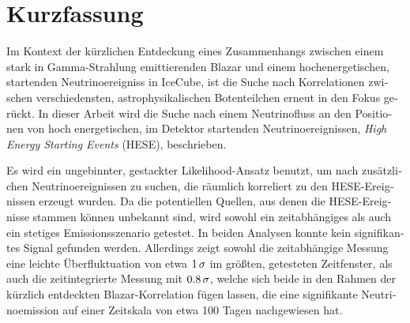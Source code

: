 \section*{Kurzfassung}
\begin{german}
Im Kontext der kürzlichen Entdeckung eines Zusammenhangs zwischen einem stark in Gamma-Strahlung emittierenden Blazar und einem hochenergetischen, startenden Neutrinoereigniss in IceCube, ist die Suche nach Korrelationen zwischen verschiedensten, astrophysikalischen Botenteilchen erneut in den Fokus gerückt.
In dieser Arbeit wird die Suche nach einem Neutrinofluss an den Positionen von hoch energetischen, im Detektor startenden Neutrinoereignissen, \emph{High Energy Starting Events} (HESE), beschrieben.


Es wird ein ungebinnter, gestackter Likelihood-Ansatz benutzt, um nach zusätzlichen Neutrinoereignissen zu suchen, die räumlich korreliert zu den HESE-Ereignissen erzeugt wurden.
Da die potentiellen Quellen, aus denen die HESE-Ereignisse stammen können unbekannt sind, wird sowohl ein zeitabhängiges als auch ein stetiges Emissionsszenario getestet.
In beiden Analysen konnte kein signifikantes Signal gefunden werden.
Allerdings zeigt sowohl die zeitabhängige Messung eine leichte Überfluktuation von etwa $\num{1}\,\sigma$ im größten, getesteten Zeitfenster, als auch die zeitintegrierte Messung mit $\num{0.8}\,\sigma$, welche sich beide in den Rahmen der kürzlich entdeckten Blazar-Korrelation fügen lassen, die eine signifikante Neutrinoemission auf einer Zeitskala von etwa 100 Tagen nachgewiesen hat.
\end{german}